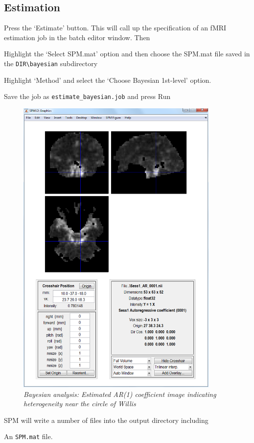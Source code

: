 \subsection{Estimation}

Press the `Estimate' button. This will call up the specification of an fMRI estimation job in the batch editor window. Then
\bi
\item{Highlight the `Select SPM.mat' option and then choose the SPM.mat
file saved in the \verb!DIR\bayesian! subdirectory}
\item{Highlight `Method' and select the `Choose Bayesian 1st-level' option.}
\item{Save the job as \verb!estimate_bayesian.job! and press Run}
\ei
\begin{figure}
\begin{center}
\includegraphics[width=100mm]{faces/face_ar1}
\caption{\em Bayesian analysis: Estimated AR(1) coefficient image indicating heterogeneity near the circle of Willis \label{face_ar1} }
\end{center}
\end{figure}
SPM will write a number of files into the output directory including 
\bi
\item{An \verb!SPM.mat! file.}

